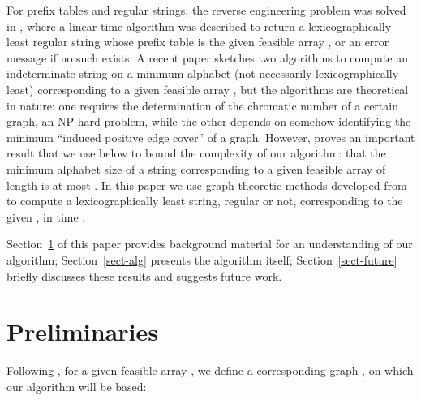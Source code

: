 \documentclass[runningheads,a4paper]{llncs}
\def\s#1{\mbox{\boldmath }}
\newif\ifRev
\begin{document}
For prefix tables and regular strings,
the reverse engineering problem was solved in \cite{CCR09},
where a linear-time algorithm was described to return
a lexicographically least regular string \s{x} whose
prefix table is the given feasible array \s{y}, or an error message if no
such \s{x} exists.
A recent paper \cite{BBD14} sketches two algorithms
to compute an indeterminate string \s{x} on a minimum alphabet
(not necessarily lexicographically least) corresponding to
a given feasible array \s{y},
but the algorithms are theoretical in nature:
one requires the determination of the chromatic number of a certain graph,
an NP-hard problem,
while the other depends on somehow identifying the minimum
``induced positive edge cover'' of a graph.
However, \cite{BBD14} proves an important result that we use
below to bound the complexity of our algorithm:
that the minimum alphabet size  of a string corresponding
to a given feasible array of length  is at most .
In this paper
we use graph-theoretic methods developed from \cite{CRSW13}
to compute a lexicographically least string,
regular or not, corresponding to the given \s{y},
in time .




Section~\ref{sect-prelim} of this paper provides background material
for an understanding of our algorithm;
Section~\ref{sect-alg} presents the algorithm itself;
Section~\ref{sect-future} briefly discusses these results
and suggests future work.

\section{Preliminaries}
\label{sect-prelim}
Following \cite{CRSW13}, for a given feasible array ,
we define a corresponding graph ,
on which our algorithm will be based:

\ifRev
\begin{figure}[htbp]
\label{fig-assign}
  \begin{minipage}{0.5\linewidth}
  \centering
  \texttt{[image: ex-1-p]}
  \caption{ for }\label{Graph-ex-1-p}
  \end{minipage}
  \hfill
  \begin{minipage}{0.5\linewidth}
  \centering
  \texttt{[image: ex-1-n]}\\
  \caption{ for }\label{Graph-ex-1-n}
  \end{minipage}
\end{figure}
\fi
\end{document}
